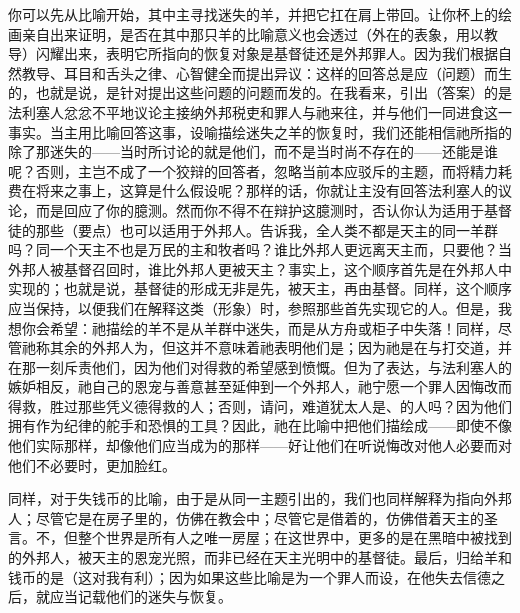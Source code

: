 你可以先从比喻开始，其中主寻找迷失的羊，并把它扛在肩上带回。让你杯上的绘画亲自出来证明，是否在其中那只羊的比喻意义也会透过（外在的表象，用以教导）闪耀出来，表明它所指向的恢复对象是基督徒还是外邦罪人。因为我们根据自然教导、耳目和舌头之律、心智健全而提出异议：这样的回答总是应（问题）而生的，也就是说，是针对提出这些问题的问题而发的。在我看来，引出（答案）的是法利塞人忿忿不平地议论主接纳外邦税吏和罪人与祂来往，并与他们一同进食这一事实。当主用比喻回答这事，设喻描绘迷失之羊的恢复时，我们还能相信祂所指的除了那迷失的——当时所讨论的就是他们，而不是当时尚不存在的——还能是谁呢？否则，主岂不成了一个狡辩的回答者，忽略当前本应驳斥的主题，而将精力耗费在将来之事上，这算是什么假设呢？那样的话，你就让主没有回答法利塞人的议论，而是回应了你的臆测。然而你不得不在辩护这臆测时，否认你认为适用于基督徒的那些（要点）也可以适用于外邦人。告诉我，全人类不都是天主的同一羊群吗？同一个天主不也是万民的主和牧者吗？谁比外邦人更远离天主而，只要他？当外邦人被基督召回时，谁比外邦人更被天主？事实上，这个顺序首先是在外邦人中实现的；也就是说，基督徒的形成无非是先，被天主，再由基督。同样，这个顺序应当保持，以便我们在解释这类（形象）时，参照那些首先实现它的人。但是，我想你会希望：祂描绘的羊不是从羊群中迷失，而是从方舟或柜子中失落！同样，尽管祂称其余的外邦人为，但这并不意味着祂表明他们是；因为祂是在与打交道，并在那一刻斥责他们，因为他们对得救的希望感到愤慨。但为了表达，与法利塞人的嫉妒相反，祂自己的恩宠与善意甚至延伸到一个外邦人，祂宁愿一个罪人因悔改而得救，胜过那些凭义德得救的人；否则，请问，难道犹太人是、的人吗？因为他们拥有作为纪律的舵手和恐惧的工具？因此，祂在比喻中把他们描绘成——即使不像他们实际那样，却像他们应当成为的那样——好让他们在听说悔改对他人必要而对他们不必要时，更加脸红。\par

同样，对于失钱币的比喻，由于是从同一主题引出的，我们也同样解释为指向外邦人；尽管它是在房子里的，仿佛在教会中；尽管它是借着的，仿佛借着天主的圣言。不，但整个世界是所有人之唯一房屋；在这世界中，更多的是在黑暗中被找到的外邦人，被天主的恩宠光照，而非已经在天主光明中的基督徒。最后，归给羊和钱币的是（这对我有利）；因为如果这些比喻是为一个罪人而设，在他失去信德之后，就应当记载他们的迷失与恢复。\par

